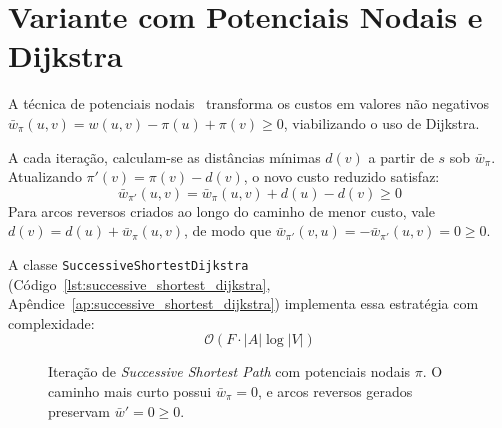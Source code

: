 \section{Variante com Potenciais Nodais e Dijkstra}\label{sec:ssp_dijkstra}

A técnica de potenciais nodais~\cite{edmonds1972theoretical} transforma os custos em valores não negativos $\bar{w}_\pi(u,v) = w(u,v) - \pi(u) + \pi(v) \ge 0$, viabilizando o uso de Dijkstra.

A cada iteração, calculam-se as distâncias mínimas $d(v)$ a partir de $s$ sob $\bar{w}_\pi$. Atualizando $\pi'(v) = \pi(v) - d(v)$, o novo custo reduzido satisfaz:
\begin{equation}
    \bar{w}_{\pi'}(u,v) = \bar{w}_\pi(u,v) + d(u) - d(v) \ge 0
\end{equation}
Para arcos reversos criados ao longo do caminho de menor custo, vale $d(v) = d(u) + \bar{w}_\pi(u,v)$, de modo que $\bar{w}_{\pi'}(v,u) = -\bar{w}_{\pi'}(u,v) = 0 \ge 0$.

A classe \lstinline{SuccessiveShortestDijkstra} (Código~\ref{lst:successive_shortest_dijkstra}, Apêndice~\ref{ap:successive_shortest_dijkstra}) implementa essa estratégia com complexidade:
\begin{equation}
    \mathcal{O}(F \cdot |A| \log |V|)
\end{equation}

\begin{figure}[!ht]
\centering
{}
\caption{Iteração de \textit{Successive Shortest Path} com potenciais nodais $\pi$. O caminho mais curto possui $\bar{w}_\pi = 0$, e arcos reversos gerados preservam $\bar{w}' = 0 \ge 0$.}
\label{fig:ssp_iteracao}
\end{figure}


